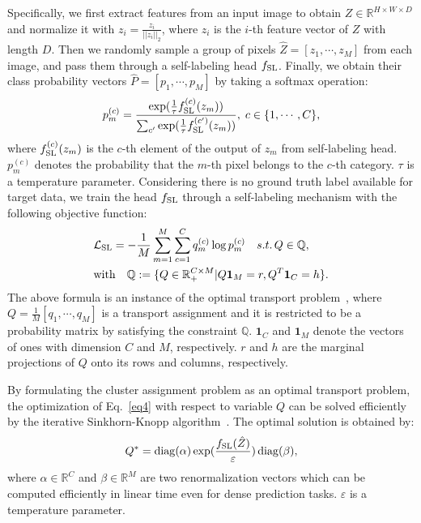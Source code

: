 \documentclass[10pt,twocolumn,letterpaper]{article}
\DeclareMathOperator*{\diag}{diag}
\begin{document}
	Specifically, we first extract features from an input image to obtain ${Z}\in \mathbb{R}^{H\times W\times D}$ and normalize it with ${{ z}_i}=\frac{{ z}_i}{||{ z}_i||_2}$, where $z_i$ is the $i$-th feature vector of $Z$ with length $D$. Then we randomly sample a group of pixels $\hat{Z}=[{ z}_1,\cdots,{ z}_M]$ from each image, and pass them through a self-labeling head $f_{\rm SL}$. Finally, we obtain their class probability vectors $\hat{P}= [p_1,\cdots,p_M]$ by taking a softmax operation: 
	\begin{align}
		p_m^{(c)} = \frac{\exp(\frac{1}{\tau}f_{\rm SL}^{(c)}(z_m))}{{\sum_{c'}\exp(\frac{1}{\tau}f_{\rm SL}^{(c')}(z_m))}}, \; c \in \{1,\cdots,C\},
	\end{align}
	where $f_{\rm SL}^{(c)}(z_m)$ is the $c$-th element of the output of $z_m$ from self-labeling head. $p_m^{(c)}$ denotes the probability that the $m$-th pixel belongs to the $c$-th category. $\tau$ is a temperature parameter. Considering there is no ground truth label available for target data, we train the head $f_{\rm SL}$ through a self-labeling mechanism \cite{asano2020self} with the following objective function:
	{\small 
		\begin{equation}
			\begin{split}
				&\mathcal{L}_{\rm SL}=-\frac{1}{M}\sum_{m=1}^{M}\sum_{c=1}^{C}{ q}_m^{(c)}\log{ p}_m^{(c)}\quad  s.t.\, Q\in\mathbb{Q},
				\\ & {\rm with}\quad  \mathbb{Q}:=\{Q\in \mathbb{R}_+^{C\times M}|Q\mathbf{1}_M=r, Q^T\mathbf{1}_C=h\}.
				\label{eq4}
	\end{split}\end{equation}}The above formula is an instance of the optimal transport problem~\cite{cuturi2013sinkhorn}, where $Q=\frac{1}{M}[{ q}_1, \cdots, { q}_M]$ is a transport assignment and it is restricted to be a probability matrix by satisfying the constraint $\mathbb{Q}$.  $\mathbf{1}_C$ and $\mathbf{1}_M$ denote the vectors of ones with dimension $C$ and $M$, respectively. $r$ and $h$ are the marginal projections of $Q$ onto its rows and columns, respectively. 


	By formulating the cluster assignment problem as an optimal transport problem, the optimization of Eq.~\ref{eq4} with respect to variable $Q$ can be solved efficiently by the iterative Sinkhorn-Knopp algorithm~\cite{cuturi2013sinkhorn}. The optimal solution is obtained by:
	\begin{align}
		Q^* = {\diag}(\alpha)\exp(\frac{f_{\rm SL}(\hat{Z})}{\varepsilon})\diag(\beta),
	\end{align}
	where $\alpha \in \mathbb{R}^C$ and $\beta \in \mathbb{R}^M$ are two renormalization vectors which can be computed efficiently in linear time even for dense prediction tasks. $\varepsilon$ is a temperature parameter. 
	
\end{document}
